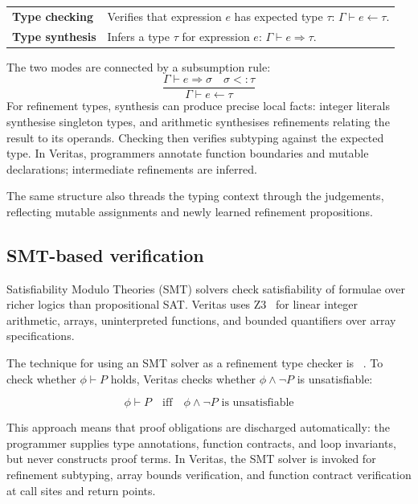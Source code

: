 \begin{center}
\small
\begin{tabularx}{0.94\textwidth}{>{\raggedright\arraybackslash}p{} >{\raggedright\arraybackslash}X}
\toprule
\textbf{Type checking} & Verifies that expression $e$ has expected type $\tau$: $\Gamma \vdash e \leftarrow \tau$. \\
\textbf{Type synthesis} & Infers a type $\tau$ for expression $e$: $\Gamma \vdash e \Rightarrow \tau$. \\
\bottomrule
\end{tabularx}
\end{center}
\noindent The two modes are connected by a subsumption rule:
$$
  \frac{\Gamma \vdash e \Rightarrow \sigma \quad \sigma <: \tau}{\Gamma \vdash e \leftarrow \tau}
$$
For refinement types, synthesis can produce precise local facts: integer literals synthesise singleton types, and arithmetic synthesises refinements relating the result to its operands. Checking then verifies subtyping against the expected type. In Veritas, programmers annotate function boundaries and mutable declarations; intermediate refinements are inferred.

The same structure also threads the typing context through the judgements, reflecting mutable assignments and newly learned refinement propositions.

\subsection{SMT-based verification}
\label{sec:smt-based-ver}

Satisfiability Modulo Theories (SMT) solvers check satisfiability of formulae over richer logics than propositional SAT. Veritas uses Z3~\cite{DeMoura2008Z3} for linear integer arithmetic, arrays, uninterpreted functions, and bounded quantifiers over array specifications.

The technique for using an SMT solver as a refinement type checker is ~\cite{Rondon2008Liquid}. To check whether $\phi \vdash P$ holds, Veritas checks whether $\phi \wedge \lnot P$ is unsatisfiable:

\[
  \phi \vdash P
  \quad\text{iff}\quad
  \phi \wedge \lnot P \text{ is unsatisfiable}
\]

This approach means that proof obligations are discharged automatically: the programmer supplies type annotations, function contracts, and loop invariants, but never constructs proof terms. In Veritas, the SMT solver is invoked for refinement subtyping, array bounds verification, and function contract verification at call sites and return points.

